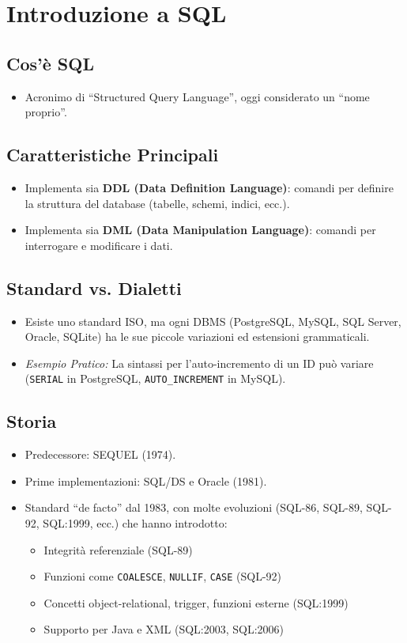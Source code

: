 \section{Introduzione a SQL}

\subsection{Cos'è SQL}
\begin{itemize}
	\item Acronimo di ``Structured Query Language'', oggi considerato un ``nome proprio''.
\end{itemize}

\subsection{Caratteristiche Principali}
\begin{itemize}
	\item Implementa sia \textbf{DDL (Data Definition Language)}: comandi per definire la struttura del database (tabelle, schemi, indici, ecc.).
	\item Implementa sia \textbf{DML (Data Manipulation Language)}: comandi per interrogare e modificare i dati.
\end{itemize}

\subsection{Standard vs. Dialetti}
\begin{itemize}
	\item Esiste uno standard ISO, ma ogni DBMS (PostgreSQL, MySQL, SQL Server, Oracle, SQLite) ha le sue piccole variazioni ed estensioni grammaticali.
	\item \textit{Esempio Pratico:} La sintassi per l'auto-incremento di un ID può variare (\texttt{SERIAL} in PostgreSQL, \texttt{AUTO\_INCREMENT} in MySQL).
\end{itemize}

\subsection{Storia}
\begin{itemize}
	\item Predecessore: SEQUEL (1974).
	\item Prime implementazioni: SQL/DS e Oracle (1981).
	\item Standard ``de facto'' dal 1983, con molte evoluzioni (SQL-86, SQL-89, SQL-92, SQL:1999, ecc.) che hanno introdotto:
	\begin{itemize}
		\item Integrità referenziale (SQL-89)
		\item Funzioni come \texttt{COALESCE}, \texttt{NULLIF}, \texttt{CASE} (SQL-92)
		\item Concetti object-relational, trigger, funzioni esterne (SQL:1999)
		\item Supporto per Java e XML (SQL:2003, SQL:2006)
	\end{itemize}
\end{itemize}


